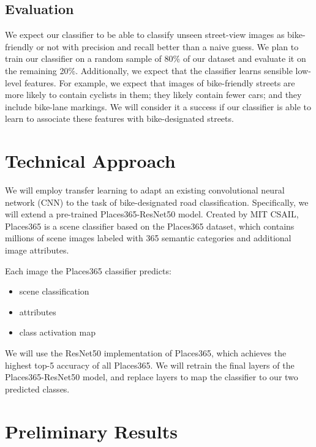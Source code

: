 \documentclass[10pt,twocolumn,letterpaper]{article}
\begin{document}
\subsection{Evaluation}

We expect our classifier to be able to classify unseen street-view images as bike-friendly or not with precision and recall better than a naive guess. We plan to train our classifier on a random sample of 80\% of our dataset and evaluate it on the remaining 20\%. Additionally, we expect that the classifier learns sensible low-level features. For example, we expect that images of bike-friendly streets are more likely to contain cyclists in them; they likely contain fewer cars; and they include bike-lane markings. We will consider it a success if our classifier is able to learn to associate these features with bike-designated streets.

\section{Technical Approach}

We will employ transfer learning to adapt an existing convolutional neural network (CNN) to the task of bike-designated road classification. Specifically, we will extend a pre-trained Places365-ResNet50 model. Created by MIT CSAIL, Places365 is a scene classifier based on the Places365 dataset, which contains millions of scene images labeled with 365 semantic categories and additional image attributes. 

Each image the Places365 classifier predicts: 

\begin{itemize}
	\itemsep0em 
	\item scene classification 
	\item attributes
	\item class activation map
\end{itemize}

We will use the ResNet50 implementation of Places365, which achieves the highest top-5 accuracy of all Places365. We will retrain the final layers of the Places365-ResNet50 model, and replace layers to map the classifier to our two predicted classes.

\section{Preliminary Results}
\end{document}
